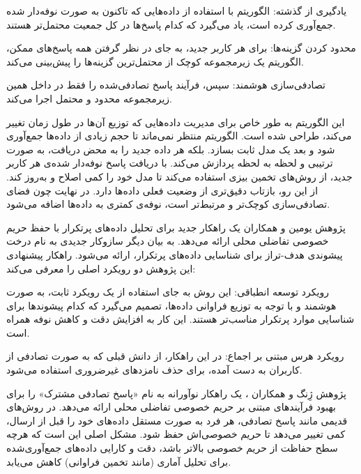 
 یادگیری از گذشته: الگوریتم با استفاده از داده‌هایی که تاکنون به صورت نوفه‌دار شده جمع‌آوری کرده است، یاد می‌گیرد که کدام پاسخ‌ها در کل جمعیت محتمل‌تر هستند.

 محدود کردن گزینه‌ها: برای هر کاربر جدید، به جای در نظر گرفتن همه پاسخ‌های ممکن، الگوریتم یک زیرمجموعه کوچک از محتمل‌ترین گزینه‌ها را پیش‌بینی می‌کند.

 تصادفی‌سازی هوشمند: سپس، فرآیند پاسخ تصادفی‌شده را فقط در داخل همین زیرمجموعه محدود و محتمل اجرا می‌کند.


این الگوریتم به طور خاص برای مدیریت داده‌هایی که توزیع آن‌ها در طول زمان تغییر می‌کند، طراحی شده است. الگوریتم منتظر نمی‌ماند تا حجم زیادی از داده‌ها جمع‌آوری شود و بعد یک مدل ثابت بسازد. بلکه هر داده جدید را به محض دریافت، به صورت ترتیبی و لحظه به لحظه پردازش می‌کند. با دریافت پاسخ نوفه‌دار شده‌ی هر کاربر جدید، از روش‌های تخمین بیزی استفاده می‌کند تا مدل خود را کمی اصلاح و به‌روز کند. از این رو، بازتاب دقیق‌تری از وضعیت فعلی داده‌ها دارد. در نهایت چون فضای تصادفی‌سازی کوچک‌تر و مرتبط‌تر است، نوفه‌ی کمتری به داده‌ها اضافه می‌شود.


پژوهش یومین و همکاران  یک راهکار جدید برای تحلیل داده‌های پرتکرار با حفظ حریم خصوصی تفاضلی محلی ارائه می‌دهد. به بیان دیگر سازوکار جدیدی به نام درخت پیشوندی هدف-تراز برای شناسایی داده‌های پرتکرار، ارائه می‌شود. راهکار پیشنهادی این پژوهش دو رویکرد اصلی را معرفی می‌کند:


 رویکرد توسعه انطباقی: این روش به جای استفاده از یک رویکرد ثابت، به صورت هوشمند و با توجه به توزیع فراوانی داده‌ها، تصمیم می‌گیرد که کدام پیشوندها برای شناسایی موارد پرتکرار مناسب‌تر هستند. این کار به افزایش دقت و کاهش نوفه همراه است.

 رویکرد هرس مبتنی بر اجماع: در این راهکار، از دانش قبلی که به صورت تصادفی از کاربران به دست آمده، برای حذف نامزدهای غیرضروری استفاده می‌شود.



پژوهش ژِنگ و همکاران ، یک راهکار نوآورانه به نام «پاسخ تصادفی مشترک» را برای بهبود فرآیندهای مبتنی بر حریم خصوصی تفاضلی محلی ارائه می‌دهد. در روش‌های قدیمی مانند پاسخ تصادفی، هر فرد به صورت مستقل داده‌های خود را قبل از ارسال، کمی تغییر می‌دهد تا حریم خصوصی‌اش حفظ شود. مشکل اصلی این است که هرچه سطح حفاظت از حریم خصوصی بالاتر باشد، دقت و کارایی داده‌های جمع‌آوری‌شده برای تحلیل آماری (مانند تخمین فراوانی) کاهش می‌یابد.

